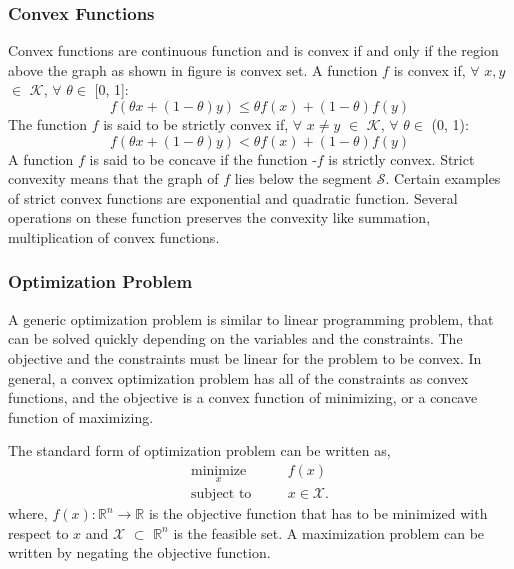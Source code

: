\documentclass[a4paper, 12pt,titlepage]{dithesis} %
\newcommand{\me}[1]{\( #1 \)}
\begin{document}
\subsubsection{Convex Functions}

Convex functions are continuous function and is convex if and only if the region above the graph as shown in figure is convex set. A function \me{f} is convex if, \me{\forall} \me{x, y} \me{\in} \me{\mathcal{K}}, \me{ \forall} \me{ \theta \in} [0, 1]: 
\begin{equation}
f(\theta x + (1 - \theta) y) \leq \theta f(x) + (1 - \theta) f(y)
\end{equation}
The function \me{f} is said to be strictly convex if, \me{ \forall} \me{x \neq y} \me{\in} \me{\mathcal{K}}, \me{ \forall} \me{ \theta \in} (0, 1):
\begin{equation}
f(\theta x + (1 - \theta) y) < \theta f(x) + (1 - \theta) f(y)
\end{equation}
A function \me{f} is said to be concave if the function -\me{f} is strictly convex. Strict convexity means that the graph of \me{f} lies below the segment \me{\mathcal{S}}. Certain examples of strict convex functions are exponential and quadratic function. Several operations on these function preserves the convexity like summation, multiplication of convex functions. 

\subsubsection{Optimization Problem}

A generic optimization problem is similar to linear programming problem, that can be solved quickly depending on the variables and the constraints. The objective and the constraints must be linear for the problem to be convex. In general, a convex optimization problem has all of the constraints as convex functions, and the objective is a convex function of minimizing, or a concave function of maximizing. 

The standard form of optimization problem can be written as,
\begin{eqnarray}
\underset{x}{\text{minimize}} \quad && f(x) \\
\text{subject to} \quad && x \in \mathcal{X}. 
\end{eqnarray}
where, \me{f(x): {\mathbb{R}^n} \rightarrow {\mathbb{R}}} is the objective function that has to be minimized with respect to \me{x} and \me{\mathcal{X}} \me{\subset} \me{{\mathbb{R}^n}} is the feasible set. A maximization problem can be written by negating the objective function.
\end{document}
